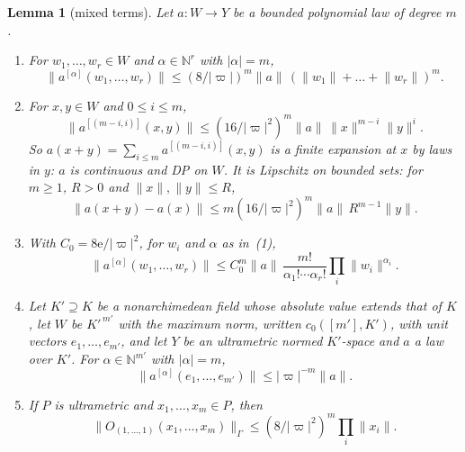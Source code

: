 \documentclass[11pt]{amsart}
\newtheorem{lemma}[theorem]{Lemma}
\theoremstyle{definition}
\theoremstyle{remark}
\numberwithin{equation}{section}
\newcommand{\N}{\mathbb N}
\newcommand{\abs}[1]{\lvert #1\rvert}
\newcommand{\norm}[1]{\lVert #1\rVert}
\theoremstyle{plain}
\theoremstyle{definition}
\theoremstyle{plain}
\begin{document}
\begin{lemma}[mixed terms]\label{amb:lem:mixed}
Let $a\colon W\to Y$ be a bounded polynomial law of degree $m$.
\begin{enumerate}
\item For $w_1,\dots,w_r\in W$ and $\alpha\in\N^r$ with $\abs\alpha=m$,
\begin{equation}\label{amb:eq:mixed-sum}
 \norm{a^{[\alpha]}(w_1,\dots,w_r)}\le(8/\abs\varpi)^m\norm a\,(\norm{w_1}+\dots+\norm{w_r})^m.
\end{equation}
\item For $x,y\in W$ and $0\le i\le m$,
\begin{equation}\label{amb:eq:binomial}
 \norm{a^{[(m-i,i)]}(x,y)}\le(16/\abs\varpi^2)^m\norm a\,\norm x^{m-i}\norm y^i.
\end{equation}
So $a(x+y)=\sum_{i\le m}a^{[(m-i,i)]}(x,y)$ is a finite expansion at $x$ by laws in $y$: $a$ is continuous and DP on $W$. It is Lipschitz on bounded sets: for $m\ge1$, $R>0$ and $\norm x,\norm y\le R$,
\begin{equation}\label{amb:eq:lipschitz}
 \norm{a(x+y)-a(x)}\le m(16/\abs\varpi^2)^m\norm a\,R^{m-1}\norm y.
\end{equation}
\item With $C_0=8\mathrm e/\abs\varpi^2$, for $w_i$ and $\alpha$ as in~(1),
\begin{equation}\label{amb:eq:multinomial}
 \norm{a^{[\alpha]}(w_1,\dots,w_r)}\le C_0^m\norm a\,\frac{m!}{\alpha_1!\cdots\alpha_r!}\prod_i\norm{w_i}^{\alpha_i}.
\end{equation}
\item Let $K'\supseteq K$ be a nonarchimedean field whose absolute value extends that of $K$, let $W$ be $K'^{\,m'}$ with the maximum norm, written $c_0([m'],K')$, with unit vectors $e_1,\dots,e_{m'}$, and let $Y$ be an ultrametric normed $K'$\nobreakdash-space and $a$ a law over $K'$. For $\alpha\in\N^{m'}$ with $\abs\alpha=m$,
\begin{equation}\label{amb:eq:node}
 \norm{a^{[\alpha]}(e_1,\dots,e_{m'})}\le\abs\varpi^{-m}\norm a.
\end{equation}
\item If $P$ is ultrametric and $x_1,\dots,x_m\in P$, then
\begin{equation}\label{amb:eq:sym}
 \norm{O_{(1,\dots,1)}(x_1,\dots,x_m)}_\Gamma\le(8/\abs\varpi^2)^m\prod_i\norm{x_i}.
\end{equation}
\end{enumerate}
\end{lemma}
\end{document}
